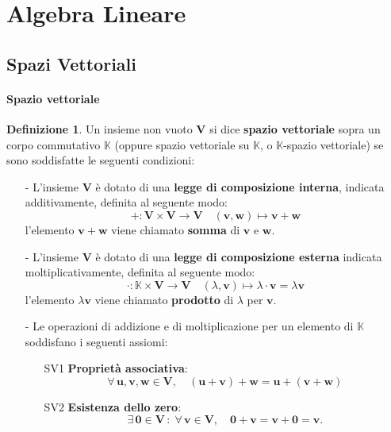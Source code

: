 \documentclass{article}
\theoremstyle{plain}
\theoremstyle{definition}
\newtheorem{defn}{Definizione}[section]
\theoremstyle{remark}
\begin{document}
\section{Algebra Lineare}
\vspace{20pt}

\vspace{20pt}
\subsection{Spazi Vettoriali}
\vspace{20pt}

\paragraph{Spazio vettoriale}
\begin{bxthm}
\begin{defn}
    Un insieme non vuoto $\mathbf{V}$ si dice \textbf{spazio vettoriale} sopra un corpo commutativo $\mathbb{K}$ (oppure spazio vettoriale su $\mathbb{K}$, o $\mathbb{K}$-spazio vettoriale) se sono soddisfatte le seguenti condizioni:
    \begin{itemize}
        \item[-] L'insieme $\mathbf{V}$ è dotato di una \textbf{legge di composizione interna}, indicata additivamente, definita al seguente modo:
        \[ +:\mathbf{V}\times \mathbf{V}\to \mathbf{V}\quad(\mathbf{v},\mathbf{w})\mapsto \mathbf{v}+\mathbf{w} \]
        l'elemento $\mathbf{v}+\mathbf{w}$ viene chiamato \textbf{somma} di $\mathbf{v}$ e $\mathbf{w}$.
        \item[-] L'insieme $\mathbf{V}$ è dotato di una \textbf{legge di composizione esterna} indicata moltiplicativamente, definita al seguente modo:
        \[ \cdot:\mathbb{K}\times \mathbf{V}\to\mathbf{V}\quad (\lambda,\mathbf{v})\mapsto \lambda\cdot\mathbf{v}=\lambda\mathbf{v} \]
        l'elemento $\lambda\mathbf{v}$ viene chiamato \textbf{prodotto} di $\lambda$ per $\mathbf{v}$.
        \item[-] Le operazioni di addizione e di moltiplicazione per un elemento di $\mathbb{K}$ soddisfano i seguenti assiomi:
        \begin{itemize}
            \item[SV1] \textbf{Proprietà associativa}:
            \[\forall\,\mathbf{u},\mathbf{v},\mathbf{w}\in \mathbf{V},\quad (\mathbf{u} + \mathbf{v}) + \mathbf{w} = \mathbf{u} + (\mathbf{v} + \mathbf{w}) \]
            
            \item[SV2] \textbf{Esistenza dello zero}:
            \[\exists\,\mathbf{0} \in \mathbf{V}\,:\;\forall\,\mathbf{v}\in \mathbf{V},\quad \mathbf{0} + \mathbf{v} = \mathbf{v} + \mathbf{0} = \mathbf{v}. \]
            

\end{itemize}
\end{itemize}
\end{defn}
\end{bxthm}
\end{document}
